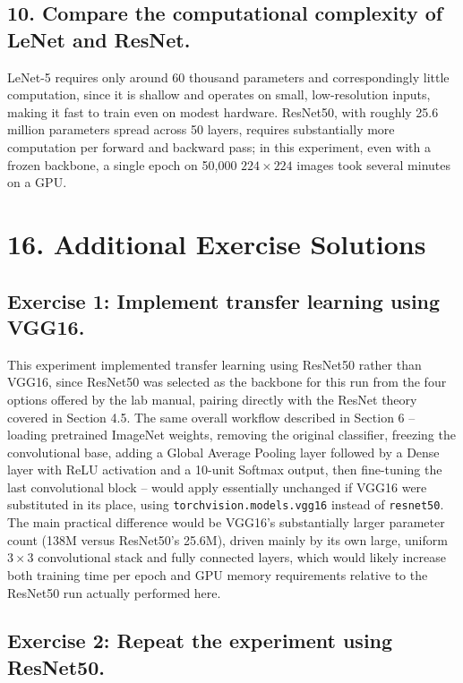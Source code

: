 \documentclass[11pt,a4paper]{article}
\begin{document}
\subsection*{10. Compare the computational complexity of LeNet and ResNet.}

LeNet-5 requires only around 60 thousand parameters and correspondingly little computation, since it is shallow and operates on small, low-resolution inputs, making it fast to train even on modest hardware. ResNet50, with roughly 25.6 million parameters spread across 50 layers, requires substantially more computation per forward and backward pass; in this experiment, even with a frozen backbone, a single epoch on 50,000 $224\times224$ images took several minutes on a GPU.

\section*{16. Additional Exercise Solutions}

\subsection*{Exercise 1: Implement transfer learning using VGG16.}

This experiment implemented transfer learning using ResNet50 rather than VGG16, since ResNet50 was selected as the backbone for this run from the four options offered by the lab manual, pairing directly with the ResNet theory covered in Section 4.5. The same overall workflow described in Section 6 -- loading pretrained ImageNet weights, removing the original classifier, freezing the convolutional base, adding a Global Average Pooling layer followed by a Dense layer with ReLU activation and a 10-unit Softmax output, then fine-tuning the last convolutional block -- would apply essentially unchanged if VGG16 were substituted in its place, using \texttt{torchvision.models.vgg16} instead of \texttt{resnet50}. The main practical difference would be VGG16's substantially larger parameter count (138M versus ResNet50's 25.6M), driven mainly by its own large, uniform $3\times3$ convolutional stack and fully connected layers, which would likely increase both training time per epoch and GPU memory requirements relative to the ResNet50 run actually performed here.

\subsection*{Exercise 2: Repeat the experiment using ResNet50.}
\end{document}
